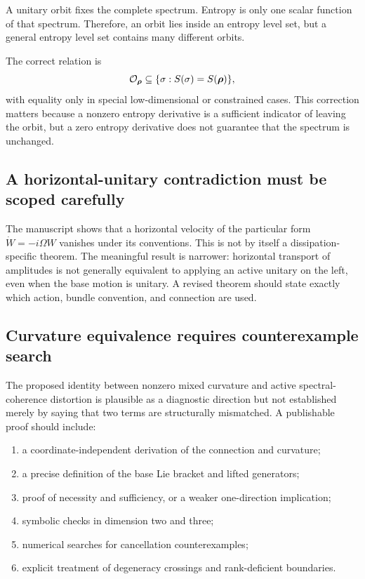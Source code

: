 \begin{criticalbox}
A unitary orbit fixes the complete spectrum. Entropy is only one scalar function of that spectrum. Therefore, an orbit lies inside an entropy level set, but a general entropy level set contains many different orbits.
\end{criticalbox}

The correct relation is
\[
\mathcal O_{\bm{\rho}}\subseteq \{\sigma:S(\sigma)=S(\bm{\rho})\},
\]
with equality only in special low-dimensional or constrained cases. This correction matters because a nonzero entropy derivative is a sufficient indicator of leaving the orbit, but a zero entropy derivative does not guarantee that the spectrum is unchanged.

\subsection{A horizontal-unitary contradiction must be scoped carefully}

The manuscript shows that a horizontal velocity of the particular form $\dot W=-i\Omega W$ vanishes under its conventions. This is not by itself a dissipation-specific theorem. The meaningful result is narrower: horizontal transport of amplitudes is not generally equivalent to applying an active unitary on the left, even when the base motion is unitary. A revised theorem should state exactly which action, bundle convention, and connection are used.

\subsection{Curvature equivalence requires counterexample search}

The proposed identity between nonzero mixed curvature and active spectral-coherence distortion is plausible as a diagnostic direction but not established merely by saying that two terms are structurally mismatched. A publishable proof should include:

\begin{enumerate}
  \item a coordinate-independent derivation of the connection and curvature;
  \item a precise definition of the base Lie bracket and lifted generators;
  \item proof of necessity and sufficiency, or a weaker one-direction implication;
  \item symbolic checks in dimension two and three;
  \item numerical searches for cancellation counterexamples;
  \item explicit treatment of degeneracy crossings and rank-deficient boundaries.
\end{enumerate}

